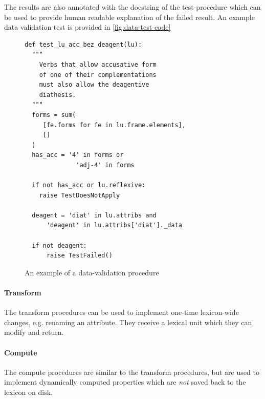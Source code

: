 \documentclass[10pt, a4paper]{article}
\begin{document}
The results are also annotated with the docstring of the test-procedure which can be used to provide human
readable explanation of the failed result. An example data validation test is provided in \autoref{fig:data-test-code}
\begin{figure}
\small
\begin{verbatim}
def test_lu_acc_bez_deagent(lu):
  """
    Verbs that allow accusative form
    of one of their complementations
    must also allow the deagentive
    diathesis.
  """
  forms = sum(
     [fe.forms for fe in lu.frame.elements],
     []
  )
  has_acc = '4' in forms or
              'adj-4' in forms

  if not has_acc or lu.reflexive:
    raise TestDoesNotApply

  deagent = 'diat' in lu.attribs and
      'deagent' in lu.attribs['diat']._data

  if not deagent:
      raise TestFailed()
\end{verbatim}
\caption{\label{fig:data-test-code}An example of a data-validation procedure}
\end{figure}

\paragraph{Transform} The transform procedures can be used to implement one-time lexicon-wide changes, e.g.
renaming an attribute. They receive a lexical unit which they can modify and return.

\paragraph{Compute} The compute procedures are similar to the transform procedures, but are used to implement dynamically computed properties which are \emph{not} saved back to the lexicon on disk.
\end{document}
